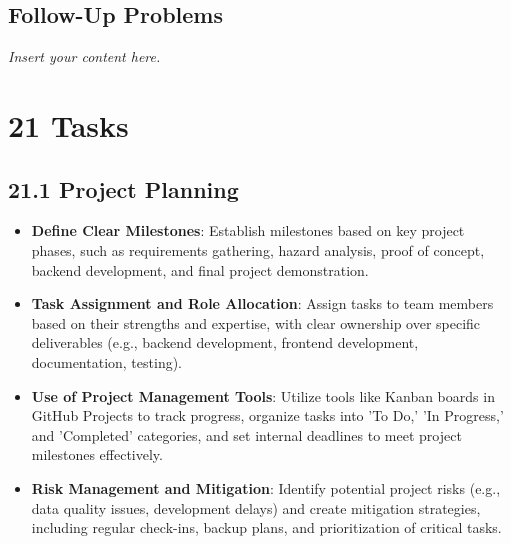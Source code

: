 \documentclass[12pt]{article}
\newcommand{\lips}{\textit{Insert your content here.}}
\begin{document}
\subsection{Follow-Up Problems}
\lips

\section*{21 Tasks}

\subsection*{21.1 Project Planning}
\begin{itemize}[leftmargin=2cm]
    \item \textbf{Define Clear Milestones}: Establish milestones based on key project phases, such as requirements gathering, hazard analysis, proof of concept, backend development, and final project demonstration.
    \item \textbf{Task Assignment and Role Allocation}: Assign tasks to team members based on their strengths and expertise, with clear ownership over specific deliverables (e.g., backend development, frontend development, documentation, testing).
    \item \textbf{Use of Project Management Tools}: Utilize tools like Kanban boards in GitHub Projects to track progress, organize tasks into 'To Do,' 'In Progress,' and 'Completed' categories, and set internal deadlines to meet project milestones effectively.
    \item \textbf{Risk Management and Mitigation}: Identify potential project risks (e.g., data quality issues, development delays) and create mitigation strategies, including regular check-ins, backup plans, and prioritization of critical tasks.
\end{itemize}
\end{document}
